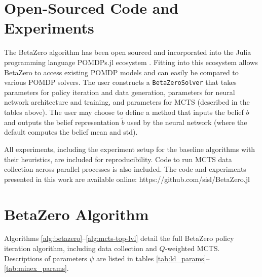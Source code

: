 \section*{Open-Sourced Code and Experiments}

The BetaZero algorithm has been open sourced and incorporated into the Julia programming language POMDPs.jl ecosystem \cite{pomdps_jl}.
Fitting into this ecosystem allows BetaZero to access existing POMDP models and can easily be compared to various POMDP solvers.
The user constructs a \texttt{BetaZeroSolver} that takes parameters for policy iteration and data generation, parameters for neural network architecture and training, and parameters for MCTS (described in the tables above).
The user may choose to define a method that inputs the belief $b$ and outputs the belief representation $\tilde{b}$ used by the neural network (where the default computes the belief mean and std).

All experiments, including the experiment setup for the baseline algorithms with their heuristics, are included for reproducibility.
Code to run MCTS data collection across parallel processes is also included.
The code and experiments presented in this work are available online: 
https://github.com/sisl/BetaZero.jl


\section*{BetaZero Algorithm}

Algorithms \ref{alg:betazero}--\ref{alg:mcts-top-lvl} detail the full BetaZero policy iteration algorithm, including data collection and $Q$-weighted MCTS.
Descriptions of parameters $\psi$ are listed in tables \ref{tab:ld_params}--\ref{tab:minex_params}.

\addtocounter{algorithm}{-3}
\begin{figure}[h!]
    \centering
    
\end{figure}
